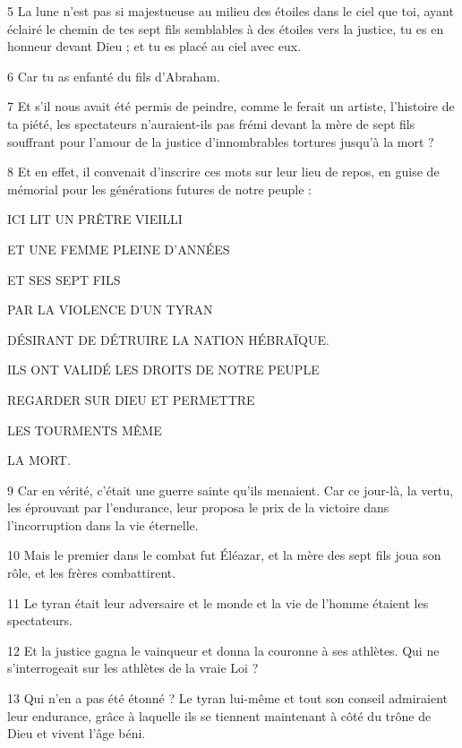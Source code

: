 \par 5 La lune n'est pas si majestueuse au milieu des étoiles dans le ciel que toi, ayant éclairé le chemin de tes sept fils semblables à des étoiles vers la justice, tu es en honneur devant Dieu ; et tu es placé au ciel avec eux.

\par 6 Car tu as enfanté du fils d'Abraham.

\par 7 Et s'il nous avait été permis de peindre, comme le ferait un artiste, l'histoire de ta piété, les spectateurs n'auraient-ils pas frémi devant la mère de sept fils souffrant pour l'amour de la justice d'innombrables tortures jusqu'à la mort ?

\par 8 Et en effet, il convenait d'inscrire ces mots sur leur lieu de repos, en guise de mémorial pour les générations futures de notre peuple :

\par ICI LIT UN PRÊTRE VIEILLI
\par ET UNE FEMME PLEINE D'ANNÉES
\par ET SES SEPT FILS
\par PAR LA VIOLENCE D'UN TYRAN
\par DÉSIRANT DE DÉTRUIRE LA NATION HÉBRAÏQUE.
\par ILS ONT VALIDÉ LES DROITS DE NOTRE PEUPLE
\par REGARDER SUR DIEU ET PERMETTRE
\par LES TOURMENTS MÊME
\par LA MORT.

\par 9 Car en vérité, c'était une guerre sainte qu'ils menaient. Car ce jour-là, la vertu, les éprouvant par l'endurance, leur proposa le prix de la victoire dans l'incorruption dans la vie éternelle.

\par 10 Mais le premier dans le combat fut Éléazar, et la mère des sept fils joua son rôle, et les frères combattirent.

\par 11 Le tyran était leur adversaire et le monde et la vie de l'homme étaient les spectateurs.

\par 12 Et la justice gagna le vainqueur et donna la couronne à ses athlètes. Qui ne s’interrogeait sur les athlètes de la vraie Loi ?

\par 13 Qui n'en a pas été étonné ? Le tyran lui-même et tout son conseil admiraient leur endurance, grâce à laquelle ils se tiennent maintenant à côté du trône de Dieu et vivent l'âge béni.

